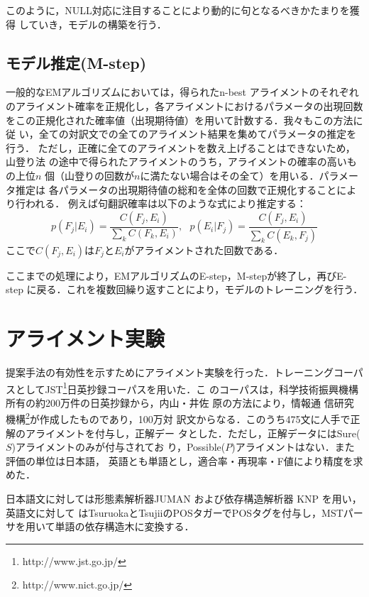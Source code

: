 \documentclass[japanese]{jnlp_1.4}
\begin{document}
このように，NULL対応に注目することにより動的に句となるべきかたまりを獲得
していき，モデルの構築を行う．



\subsection*{モデル推定(M-step)}

一般的なEMアルゴリズムにおいては，得られたn-best アライメントのそれぞれ
のアライメント確率を正規化し，各アライメントにおけるパラメータの出現回数
をこの正規化された確率値（出現期待値）を用いて計数する．我々もこの方法に従
い，全ての対訳文での全てのアライメント結果を集めてパラメータの推定を行う．
ただし，正確に全てのアライメントを数え上げることはできないため，山登り法
の途中で得られたアライメントのうち，アライメントの確率の高いもの上位$n$ 
個（山登りの回数が$n$に満たない場合はその全て）を用いる．パラメータ推定は
各パラメータの出現期待値の総和を全体の回数で正規化することにより行われる．
例えば句翻訳確率は以下のような式により推定する：
\begin{equation}
 \label{eq:normal}
 p(F_j|E_i) = \frac{C(F_j, E_i)}{\sum_{k}C(F_k, E_i)},~~~ p(E_i|F_j) = \frac{C(F_j, E_i)}{\sum_{k}C(E_k, F_j)}
\end{equation}
ここで$C(F_j, E_i)$は$F_j$と$E_i$がアライメントされた回数である．

ここまでの処理により，EMアルゴリズムのE-step，M-stepが終了し，再びE-step 
に戻る．これを複数回繰り返すことにより，モデルのトレーニングを行う．



\section{アライメント実験}
\label{result}

提案手法の有効性を示すためにアライメント実験を行った．トレーニングコーパ
スとしてJST\footnote{http://www.jst.go.jp/}日英抄録コーパスを用いた．こ
のコーパスは，科学技術振興機構所有の約200万件の日英抄録から，内山・井佐
原の方法\cite{utiyama07:_japan_englis_paten_paral_corpus}により，情報通
信研究機構\footnote{http://www.nict.go.jp/}が作成したものであり，100万対
訳文からなる．このうち475文に人手で正解のアライメントを付与し，正解デー
タとした．ただし，正解データにはSure($S$)アライメントのみが付与されてお
り，Possible($P$)アライメントはない\cite{Och03}．また評価の単位は日本語，
英語とも単語とし，適合率・再現率・F値により精度を求めた．

日本語文に対しては形態素解析器JUMAN \cite{JUMAN}および依存構造解析器
KNP \cite{kawahara-kurohashi:2006:HLT-NAACL06-Main}を用い，英語文に対して
はTsuruokaとTsujiiのPOSタガー\cite{Tsuruoka2005}でPOSタグを付与し，MSTパー
サ\cite{mstparser}を用いて単語の依存構造木に変換する．
\end{document}
